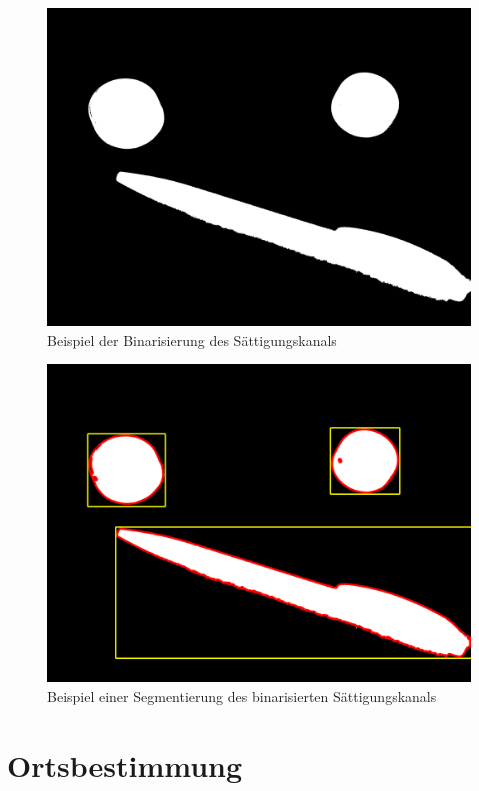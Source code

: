 \begin{figure}[h]
\centering
\includegraphics[width=\textwidth/2]{Bilder/Software/ColormodelsBinarized}
\caption{Beispiel der Binarisierung des Sättigungskanals}
\label{fig:BinarizedColorModels}
\end{figure}
\begin{figure}[h]
\centering
\includegraphics[width=\textwidth/2]{Bilder/Software/ColormodelsSegmentated}
\caption{Beispiel einer Segmentierung des binarisierten Sättigungskanals}
\label{fig:SegmentedColorModels}
\end{figure}

\section{Ortsbestimmung}
\label{sec:Ortsbestimmung}

